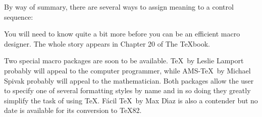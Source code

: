 By way of summary, there are several ways to assign meaning to a control 
sequence:
\vskip 6pt

You will need to know quite a bit more before you can be an efficient
macro designer. The whole story appears in Chapter 20 of The \TeX book.

Two special macro packages are soon to
be available.  \La\TeX\ by Leslie Lamport probably will appeal to the
computer programmer, while AMS-\TeX\ by Michael Spivak probably will
appeal to the mathematician. Both packages allow the user to
specify one of several formatting styles by name and in so doing they
greatly simplify the task of using \TeX.  F\'acil \TeX\ by Max D\'\i az is also
a contender but no date is available for its conversion to \TeX82.

